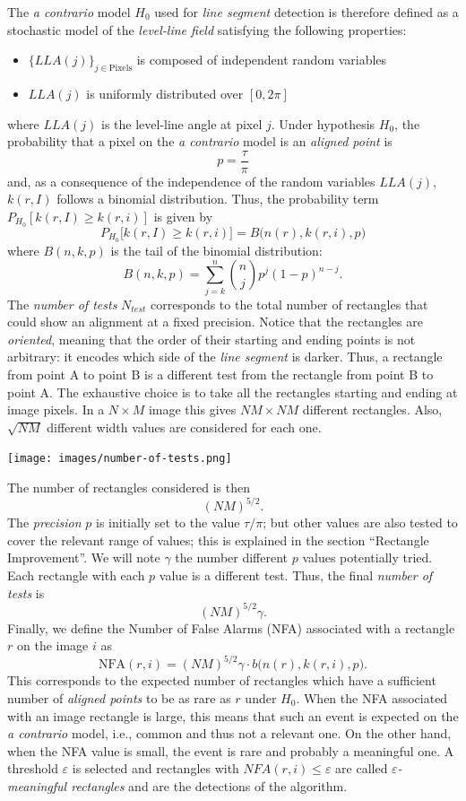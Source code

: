 \documentclass{ipol}
\begin{document}
The \emph{a contrario} model $H_0$ used for \emph{line segment}
detection is therefore defined as a stochastic model of the
\emph{level-line field} satisfying the following properties:
\begin{itemize}

  \item $\{LLA(j)\}_{j\in\textrm{Pixels}}$ is composed of independent
    random variables

  \item $LLA(j)$ is uniformly distributed over $[0,2\pi]$

\end{itemize}
where $LLA(j)$ is the level-line angle at pixel $j$. Under hypothesis
$H_0$, the probability that a pixel on the \emph{a contrario} model is
an \emph{aligned point} is
$$
   p=\frac{\tau}{\pi}
$$
and, as a consequence of the independence of the random variables
$LLA(j)$, $k(r,I)$ follows a binomial distribution. Thus, the
probability term $P_{H_0}[k(r,I)\geq k(r,i)]$ is given by
$$
   P_{H_0}\big[k(r,I) \geq k(r,i) \big] = B\big(n(r),k(r,i),p\big)
$$
where $B(n,k,p)$ is the tail of the binomial distribution:
$$
   B(n,k,p) = \sum_{j=k}^n \binom{n}{j}p^{j}(1-p)^{n-j}.
$$
The \emph{number of tests} $N_{test}$ corresponds to the total number
of rectangles that could show an alignment at a fixed
precision. Notice that the rectangles are \emph{oriented}, meaning
that the order of their starting and ending points is not arbitrary:
it encodes which side of the \emph{line segment} is darker. Thus, a
rectangle from point A to point B is a different test from the
rectangle from point B to point A. The exhaustive choice is to take
all the rectangles starting and ending at image pixels. In a $N\times
M$ image this gives $NM\times NM$ different rectangles. Also,
$\sqrt{NM}$ different width values are considered for each one.

\begin{center}
\texttt{[image: images/number-of-tests.png]}
\end{center}

The number of rectangles considered is then
$$
   (NM)^{5/2}.
$$
The \emph{precision} $p$ is initially set to the value $\tau/\pi$; but
other values are also tested to cover the relevant range of values;
this is explained in the section ``Rectangle Improvement''. We will
note $\gamma$ the number different $p$ values potentially tried. Each
rectangle with each $p$ value is a different test. Thus, the
final \emph{number of tests} is
$$
   (NM)^{5/2}\gamma.
$$
Finally, we define the Number of False Alarms (NFA) associated with a
rectangle $r$ on the image $i$ as
$$
   \textrm{NFA}(r,i) = (NM)^{5/2}\gamma\cdot b\Big(n(r),k(r,i),p\Big).
$$
This corresponds to the expected number of rectangles which have a
sufficient number of \emph{aligned points} to be as rare as $r$ under
$H_0$. When the NFA associated with an image rectangle is large, this
means that such an event is expected on the \emph{a contrario} model,
i.e., common and thus not a relevant one. On the other hand, when the
NFA value is small, the event is rare and probably a meaningful one. A
threshold $\varepsilon$ is selected and rectangles with
$NFA(r,i)\leq\varepsilon$ are called \emph{$\varepsilon$-meaningful
rectangles} and are the detections of the algorithm.
\end{document}
